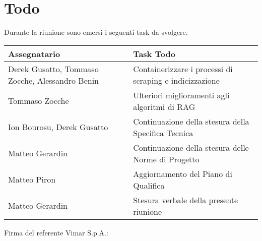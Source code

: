 \section{Todo}
Durante la riunione sono emersi i seguenti task da svolgere.

\begin{center}
    \begin{tabular}{|L{5cm}|L{8cm}|}
        \hline
        \textbf{Assegnatario} & \textbf{Task Todo} \\ \hline
        Derek Gusatto, Tommaso Zocche, Alessandro Benin &  Containerizzare i processi di scraping e indicizzazione \\ \hline
        Tommaso Zocche &  Ulteriori miglioramenti agli algoritmi di RAG \\ \hline
        Ion Bourosu, Derek Gusatto &  Continuazione della stesura della Specifica Tecnica \\ \hline
        Matteo Gerardin &  Continuazione della stesura delle Norme di Progetto \\ \hline
        Matteo Piron &  Aggiornamento del Piano di Qualifica \\ \hline
        Matteo Gerardin &  Stesura verbale della presente riunione \\ \hline
    \end{tabular}
\end{center}

\vspace{4cm}
\noindent Firma del referente Vimar S.p.A.: \underline{\hspace{5cm}}